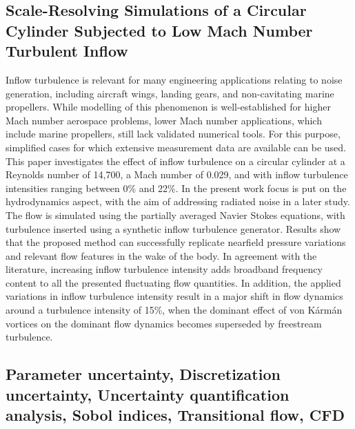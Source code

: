 \documentclass[a4paper,10pt]{article}
\begin{document}
\subsection{Scale-Resolving Simulations of a Circular Cylinder Subjected to Low Mach Number Turbulent Inflow \cite{Lidtke2021b}}

Inflow turbulence is relevant for many engineering applications relating to noise generation, including aircraft wings, landing gears, and non-cavitating marine propellers. While modelling of this phenomenon is well-established for higher Mach number aerospace problems, lower Mach number applications, which include marine propellers, still lack validated numerical tools. For this purpose, simplified cases for which extensive measurement data are available can be used. This paper investigates the effect of inflow turbulence on a circular cylinder at a Reynolds number of 14,700, a Mach number of 0.029, and with inflow turbulence intensities ranging between 0\% and 22\%. In the present work focus is put on the hydrodynamics aspect, with the aim of addressing radiated noise in a later study. The flow is simulated using the partially averaged Navier Stokes equations, with turbulence inserted using a synthetic inflow turbulence generator. Results show that the proposed method can successfully replicate nearfield pressure variations and relevant flow features in the wake of the body. In agreement with the literature, increasing inflow turbulence intensity adds broadband frequency content to all the presented fluctuating flow quantities. In addition, the applied variations in inflow turbulence intensity result in a major shift in flow dynamics around a turbulence intensity of 15\%, when the dominant effect of von Kármán vortices on the dominant flow dynamics becomes superseded by freestream turbulence.

\subsection{Parameter uncertainty, Discretization uncertainty, Uncertainty quantification analysis, Sobol indices, Transitional flow, CFD \cite{Katsuno2021}}
\end{document}
